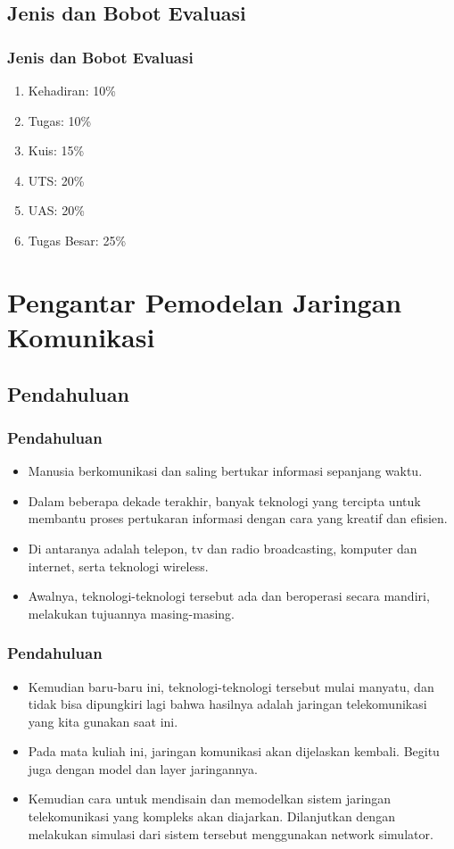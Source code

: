 \documentclass[pdflatex,compress]{beamer}
\begin{document}
\subsection{Jenis dan Bobot Evaluasi}

\begin{frame}
	\frametitle{Jenis dan Bobot Evaluasi}
	\begin{enumerate}
		\item Kehadiran: 10\%
		\item Tugas: 10\%
		\item Kuis: 15\%
		\item UTS: 20\%
		\item UAS: 20\%
		\item Tugas Besar: 25\%
	\end{enumerate}
\end{frame}

\section{Pengantar Pemodelan Jaringan Komunikasi}

\subsection{Pendahuluan}

\begin{frame}
	\frametitle{Pendahuluan}
	\begin{itemize}
		\item Manusia berkomunikasi dan saling bertukar informasi sepanjang waktu.
		\item Dalam beberapa dekade terakhir, banyak teknologi yang tercipta untuk membantu proses pertukaran informasi dengan cara yang kreatif dan efisien.
		\item Di antaranya adalah telepon, tv dan radio broadcasting, komputer dan internet, serta teknologi wireless.
		\item Awalnya, teknologi-teknologi tersebut ada dan beroperasi secara mandiri, melakukan tujuannya masing-masing.
	\end{itemize}
\end{frame}

\begin{frame}
	\frametitle{Pendahuluan}
	\begin{itemize}
		\item Kemudian baru-baru ini, teknologi-teknologi tersebut mulai manyatu, dan tidak bisa dipungkiri lagi bahwa hasilnya adalah jaringan telekomunikasi yang kita gunakan saat ini.
		\item Pada mata kuliah ini, jaringan komunikasi akan dijelaskan kembali. Begitu juga dengan model dan layer jaringannya.
		\item Kemudian cara untuk mendisain dan memodelkan sistem jaringan telekomunikasi yang kompleks akan diajarkan. Dilanjutkan dengan melakukan simulasi dari sistem tersebut menggunakan network simulator.
	\end{itemize}
\end{frame}
\end{document}
